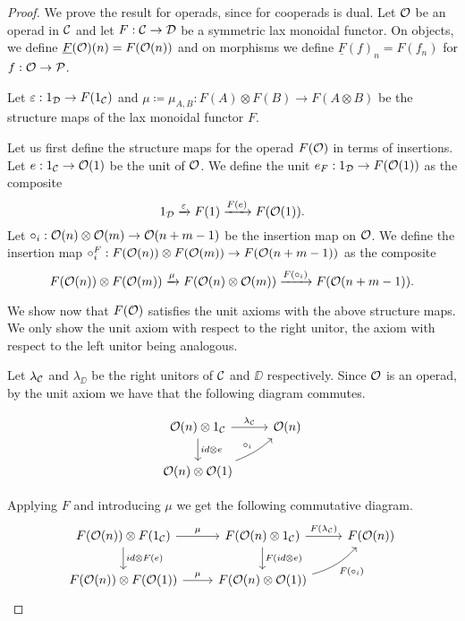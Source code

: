 \documentclass[Thesis.tex]{subfiles}
\begin{document}
\begin{proof}
We prove the result for operads, since for cooperads is dual. Let ${\mathcal O}$ be an operad in ${\mathcal C}$ and let $F:{\mathcal C}\to{\mathcal D}$ be a symmetric lax monoidal functor. On objects, we define $\underline{F}({\mathcal O})(n)= F({\mathcal O}(n))$ and on morphisms we define $\underline{F}(f)_n=F(f_n)$ for $f:{\mathcal O}\to\mathcal{P}$. 

Let $\varepsilon: 1_{\mathcal D}\to F(1_{\mathcal C})$ and $\mu\coloneqq\mu_{A,B}: F(A)\otimes F(B)\to F(A\otimes B)$ be the structure maps of the lax monoidal functor $F$. 

Let us first define the structure maps for the operad $F({\mathcal O})$ in terms of insertions. Let $e:1_{\mathcal C}\to{\mathcal O}(1)$ be the unit of ${\mathcal O}$. We define the unit $e_F:1_{\mathcal D}\to F({\mathcal O}(1))$ as the composite
\[1_{\mathcal D}\xrightarrow{\varepsilon} F(1)\xrightarrow{F(e)} F({\mathcal O}(1)).\]
Let $\circ_i :{\mathcal O}(n)\otimes{\mathcal O}(m)\to{\mathcal O}(n+m-1)$ be the insertion map on ${\mathcal O}$. We define the insertion map $\circ_i^F:F({\mathcal O}(n))\otimes F({\mathcal O}(m))\to F({\mathcal O}(n+m-1))$ as the composite
\[F({\mathcal O}(n))\otimes F({\mathcal O}(m))\xrightarrow{\mu} F({\mathcal O}(n)\otimes{\mathcal O}(m))\xrightarrow{F(\circ_i)} F({\mathcal O}(n+m-1)).\]

We show now that $F({\mathcal O})$ satisfies the unit axioms with the above structure maps. We only show the unit axiom with respect to the right unitor, the axiom with respect to the left unitor being analogous.


 Let $\lambda_{\mathcal C}$ and $\lambda_\DD$ be the right unitors of ${\mathcal C}$ and $\DD$ respectively. Since ${\mathcal O}$ is an operad, by the unit axiom we have that the following diagram commutes.
 
  \[
 \begin{tikzcd}
 \OO(n)\otimes 1_\CC\arrow[r, "\lambda_\CC"]\arrow[d, "id\otimes e"] &  \OO(n) \\
 \OO(n)\otimes \OO(1)\arrow[ur, bend right = 10, "\circ_i"]&
 \end{tikzcd}
 \]
 
Applying $F$ and introducing $\mu$ we get the following commutative diagram.
\begin{equation}\label{unitaux}
\begin{tikzcd}
F(\OO(n))\otimes F(1_\CC)\arrow[r,"\mu"]\arrow[d, "id\otimes F(e)"] & F(\OO(n)\otimes 1_\CC)\arrow[r, "F(\lambda_\CC)"]\arrow[d, "F(id\otimes e)"]&
F(\OO(n))\\
F(\OO(n))\otimes F(\OO(1))\arrow[r,"\mu"] & F(\OO(n)\otimes \OO(1))\arrow[ur, bend right = 15, "F(\circ_i)"']
\end{tikzcd}
\end{equation}


\end{proof}
\end{document}

